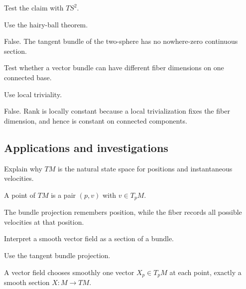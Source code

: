 \begin{exercise}\label{exr:vii07-ped-11}
Test the claim with \(TS^2\).
\end{exercise}
\begin{hint}
Use the hairy-ball theorem.
\end{hint}
\begin{solution}
False.  The tangent bundle of the two-sphere has no nowhere-zero continuous section.
\end{solution}

\begin{exercise}\label{exr:vii07-ped-12}
Test whether a vector bundle can have different fiber dimensions on one connected base.
\end{exercise}
\begin{hint}
Use local triviality.
\end{hint}
\begin{solution}
False.  Rank is locally constant because a local trivialization fixes the fiber dimension, and hence is constant on connected components.
\end{solution}

\subsection*{Applications and investigations}

\begin{exercise}\label{exr:vii07-ped-13}
Explain why \(TM\) is the natural state space for positions and instantaneous velocities.
\end{exercise}
\begin{hint}
A point of \(TM\) is a pair \((p,v)\) with \(v\in T_pM\).
\end{hint}
\begin{solution}
The bundle projection remembers position, while the fiber records all possible velocities at that position.
\end{solution}

\begin{exercise}\label{exr:vii07-ped-14}
Interpret a smooth vector field as a section of a bundle.
\end{exercise}
\begin{hint}
Use the tangent bundle projection.
\end{hint}
\begin{solution}
A vector field chooses smoothly one vector \(X_p\in T_pM\) at each point, exactly a smooth section \(X:M\to TM\).
\end{solution}

